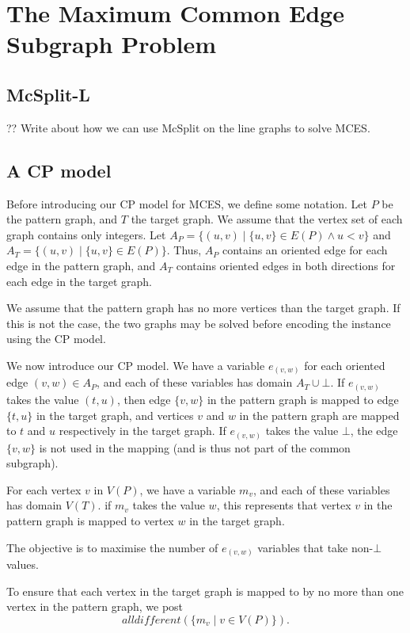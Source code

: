 \chapter{The Maximum Common Edge Subgraph Problem}
\label{c:mcsplite}

\section{McSplit-L}

?? Write about how we can use McSplit on the line graphs to solve MCES.

\section{A CP model} \label{sec:mces-cp-model}

Before introducing our CP model for MCES, we define some notation.  Let $P$ be the pattern graph,
and $T$ the target graph.  We assume that the vertex set of each graph contains only integers.
Let $A_P = \{(u,v) \mid \{u,v\} \in E(P) \wedge u < v \}$ and
    $A_T = \{(u,v) \mid \{u,v\} \in E(P) \}$.
Thus, $A_P$ contains an oriented edge for each edge in the pattern graph, and $A_T$ contains
oriented edges in both directions for each edge in the target graph.

We assume that the pattern graph has no more vertices than the target graph.  If this is not
the case, the two graphs may be solved before encoding the instance using the CP model.

We now introduce our CP model.  We have a variable $e_{(v,w)}$ for each oriented edge $(v,w) \in A_P$,
and each of these variables has domain $A_T \cup \bot$.  If $e_{(v,w)}$ takes the value $(t,u)$,
then edge $\{v,w\}$ in the pattern graph is mapped to edge $\{t,u\}$ in the target graph, and vertices
$v$ and $w$ in the pattern graph are mapped to $t$ and $u$ respectively in the target graph.
If $e_{(v,w)}$ takes the value $\bot$, the edge $\{v,w\}$ is not used in the mapping (and is thus not
part of the common subgraph).

For each vertex $v$ in $V(P)$, we have a variable $m_v$, and each of these variables has domain $V(T)$.
if $m_v$ takes the value $w$, this represents that vertex $v$ in the pattern graph is mapped to vertex
$w$ in the target graph.

The objective is to maximise the number of $e_{(v,w)}$ variables that take non-$\bot$ values.

To ensure that each vertex in the target graph is mapped to by no more than one vertex in the pattern graph,
we post
\[
\textit{alldifferent}(\{m_v \mid v \in V(P)\}).
\]

